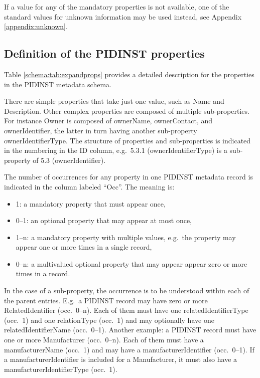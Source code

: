 \documentclass[titlepage=true,twoside=false,DIV=13]{scrartcl}
\begin{document}
If a value for any of the mandatory properties is not available, one
of the standard values for unknown information may be used instead,
see Appendix \ref{appendix:unknown}.

\subsection{Definition of the PIDINST properties}

Table \ref{schema:tab:expandprops} provides a detailed description for
the properties in the PIDINST metadata schema.

There are simple properties that take just one value, such as Name and
Description.  Other complex properties are composed of multiple
sub-properties.  For instance Owner is composed of ownerName,
ownerContact, and ownerIdentifier, the latter in turn having another
sub-property ownerIdentifierType.  The structure of properties and
sub-properties is indicated in the numbering in the ID column,
e.g.\ 5.3.1 (ownerIdentifierType) is a sub-property of 5.3
(ownerIdentifier).

The number of occurrences for any property in one PIDINST metadata
record is indicated in the column labeled ``Occ''.  The meaning is:
\begin{itemize}
\item 1: a mandatory property that must appear once,
\item 0--1: an optional property that may appear at most once,
\item 1--n: a mandatory property with multiple values, e.g.\ the
  property may appear one or more times in a single record,
\item 0--n: a multivalued optional property that may appear appear zero
  or more times in a record.
\end{itemize}
In the case of a sub-property, the occurrence is to be understood
within each of the parent entries.  E.g.\ a PIDINST record may have
zero or more RelatedIdentifier (occ.\ 0--n).  Each of them must have
one relatedIdentifierType (occ.\ 1) and one relationType (occ.\ 1) and
may optionally have one relatedIdentifierName (occ.\ 0--1).  Another
example: a PIDINST record must have one or more Manufacturer
(occ.\ 0--n).  Each of them must have a manufacturerName (occ.\ 1) and
may have a manufacturerIdentifier (occ.\ 0--1).  If a
manufacturerIdentifier is included for a Manufacturer, it must also
have a manufacturerIdentifierType (occ.\ 1).

\newlength{\idcolw}\settowidth{\idcolw}{5.3.1}
\newlength{\propcolw}\settowidth{\propcolw}{instrumentTypeIdentifierType}
\newlength{\occcolw}
\newlength{\valcolw}\settowidth{\valcolw}{Controlled list of values:}
\setlength{\defcolw}{\textwidth}
\addtolength{\defcolw}{-\idcolw}
\addtolength{\defcolw}{-\propcolw}
\addtolength{\defcolw}{-\occcolw}
\addtolength{\defcolw}{-\valcolw}
\addtolength{\defcolw}{-10\tabcolsep}
\end{document}
